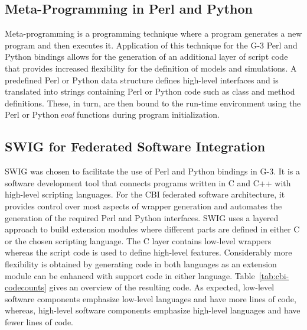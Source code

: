 \documentclass[12pt]{article}
\begin{document}

\subsection{Meta-Programming in Perl and Python}

Meta-programming is a programming technique where a program generates
a new program and then executes it.  Application of this technique for
the G-3 Perl and Python bindings allows for the generation of an
additional layer of script code that provides increased flexibility
for the definition of models and simulations.  A predefined Perl or
Python data structure defines high-level interfaces and is translated
into strings containing Perl or Python code such as class and method
definitions.  These, in turn, are then bound to the run-time
environment using the Perl or Python\,{\it eval} functions during
program initialization.

\subsection{SWIG for Federated Software Integration}

SWIG was chosen to facilitate the use of Perl and Python bindings in
G-3. It is a software development tool that connects programs written
in C and C++ with high-level scripting languages. For the CBI federated software
architecture, it provides control over most aspects of wrapper
generation and automates the generation of the required Perl and
Python interfaces. SWIG uses a layered approach to build extension
modules where different parts are defined in either C or the chosen
scripting language. The C layer contains low-level wrappers whereas
the script code is used to define high-level features.  Considerably
more flexibility is obtained by generating code in both languages as
an extension module can be enhanced with support code in either
language.  Table~\ref{tab:cbi-codecounts} gives an overview of the
resulting code.  As expected, low-level software components emphasize
low-level languages and have more lines of code, whereas, high-level
software components emphasize high-level languages and have fewer
lines of code.
\end{document}
